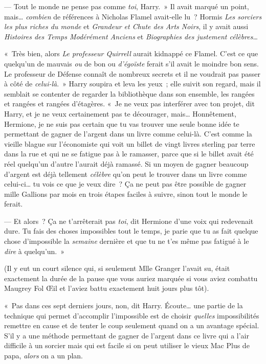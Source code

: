 --- Tout le monde ne pense pas comme \emph{toi}, Harry.~» Il avait marqué un point, mais… \emph{combien} de références à Nicholas Flamel avait-elle lu~? Hormis \emph{Les sorciers les plus riches du monde} et \emph{Grandeur et Chute des Arts Noirs}, il y avait aussi \emph{Histoires des Temps Modérément Anciens} et \emph{Biographies des justement célèbres}…

«~Très bien, alors \emph{Le professeur Quirrell} aurait kidnappé ce Flamel. C'est ce que quelqu'un de mauvais \emph{ou} de bon ou \emph{d'égoïste} ferait s'il avait le moindre bon sens. Le professeur de Défense connaît de nombreux secrets et il ne voudrait pas passer à côté de \emph{celui-là}.~» Harry soupira et leva les yeux~; elle suivit son regard, mais il semblait se contenter de regarder la bibliothèque dans son ensemble, les rangées et rangées et rangées d'étagères. «~Je ne veux pas interférer avec ton projet, dit Harry, et je ne veux certainement pas te décourager, mais… Honnêtement, Hermione, je ne suis pas certain que tu vas trouver une seule bonne idée te permettant de gagner de l'argent dans un livre comme celui-là. C'est comme la vieille blague sur l'économiste qui voit un billet de vingt livres sterling par terre dans la rue et qui ne se fatigue pas à le ramasser, parce que si le billet avait été réel quelqu'un d'autre l'aurait déjà ramassé. Si un moyen de gagner beaucoup d'argent est déjà tellement \emph{célèbre} qu'on peut le trouver dans un livre comme celui-ci… tu vois ce que je veux dire~? Ça ne peut pas être possible de gagner mille Gallions par mois en trois étapes faciles à suivre, sinon tout le monde le ferait.

--- Et alors~? Ça ne t'arrêterait pas \emph{toi}, dit Hermione d'une voix qui redevenait dure. Tu fais des choses impossibles tout le temps, je parie que tu as fait quelque chose d'impossible la \emph{semaine} dernière et que tu ne t'es même pas fatigué à le \emph{dire} à quelqu'un.~»

(Il y eut un court silence qui, si seulement Mlle Granger l'avait su, était exactement la durée de la pause que vous auriez marquée si vous aviez combattu Maugrey Fol Œil et l'aviez battu exactement huit jours plus tôt).

«~Pas dans ces sept derniers jours, non, dit Harry. Écoute… une partie de la technique qui permet d'accomplir l'impossible est de choisir \emph{quelles} impossibilités remettre en cause et de tenter le coup seulement quand on a un avantage spécial. S'il y a une méthode permettant de gagner de l'argent dans ce livre qui a l'air difficile à un sorcier mais qui est facile si on peut utiliser le vieux Mac Plus de papa, \emph{alors} on a un plan.

